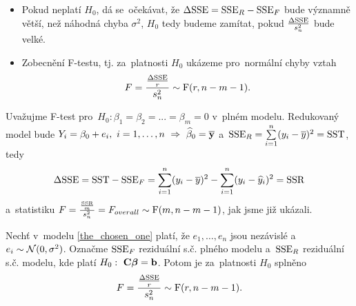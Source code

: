 \begin{itemize}
	\item Pokud neplatí $H_0$, dá se~očekávat, že $\Delta\mathrm{SSE} = \mathrm{SSE}_R-\mathrm{SSE}_F$ bude významně větší, než náhodná chyba $\sigma^2$, $H_0$ tedy budeme zamítat, pokud $\frac{\Delta\mathrm{SSE}}{s_n^2}$ bude velké.
	\item Zobecnění F-testu, tj. za~platnosti $H_0$ ukázeme pro~normální chyby vztah
	 $$ F = \frac{\frac{\Delta\mathrm{SSE}}{r}}{s_n^2}\sim\mathrm{F}(r,n-m-1). $$
\end{itemize}
\begin{example}
	Uvažujme F-test pro~$H_0:\beta_1 = \beta_2 = ... = \beta_m = 0$ v~plném modelu. Redukovaný model bude $Y_i = \beta_0+e_i,~i = 1,\dots,n~\Rightarrow~\widehat{\beta}_0 = \overline{\mathbf{y}}$ a~$\mathrm{SSE}_R = \sum\limits_{i=1}^{n} (y_i-\overline{y})^2 = \mathrm{SST}$, tedy
	 $$ \Delta \mathrm{SSE} = \mathrm{SST}-\mathrm{SSE}_F = \sum\limits_{i=1}^{n} (y_i-\overline{y})^2-\sum\limits_{i=1}^{n} (y_i-\widehat{y}_i)^2 = \mathrm{SSR} $$
	 a~statistiku $F = \frac{\frac{\mathrm{SSR}}{m}}{s_n^2} = F_{overall}\sim\mathrm{F}(m,n-m-1)$, jak jsme již ukázali.
\end{example}
\begin{theorem}
	Nechť v~modelu \eqref{the_chosen_one} platí, že $e_1,\dots,e_n$ jsou nezávislé a~$e_i\sim\mathcal{N}(0,\sigma^2)$. Označme $\mathrm{SSE}_F$ reziduální s.č. plného modelu a~$\mathrm{SSE}_R$ reziduální s.č. modelu, kde platí $H_0:~\textbf{C}\boldsymbol{\beta} = \textbf{b}$. Potom je za~platnosti $H_0$ splněno
	 $$ F = \frac{\frac{\Delta\mathrm{SSE}}{r}}{s_n^2}\sim\mathrm{F}(r,n-m-1). $$
\end{theorem}
